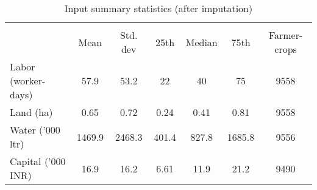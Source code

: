 \begin{table}[htbp]\centering
\def\sym#1{\ifmmode^{#1}\else\(^{#1}\)\fi}
\caption{Input summary statistics (after imputation) \label{tab:PostImputeInputSumStats}}
\begin{tabular}{l*{1}{cccccc}}
\toprule
                    &\multicolumn{6}{c}{}                                                         \\
                    &        Mean&    Std. dev&        25th&      Median&        75th&Farmer-crops\\
\midrule
Labor (worker-days) &        57.9&        53.2&          22&          40&          75&        9558\\
Land (ha)           &        0.65&        0.72&        0.24&        0.41&        0.81&        9558\\
Water ('000 ltr)    &      1469.9&      2468.3&       401.4&       827.8&      1685.8&        9556\\
Capital ('000 INR)  &        16.9&        16.2&        6.61&        11.9&        21.2&        9490\\
\bottomrule
\end{tabular}
\end{table}
